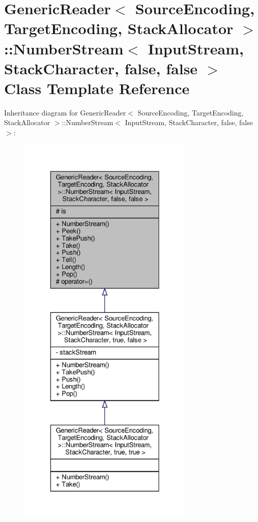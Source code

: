 \hypertarget{classGenericReader_1_1NumberStream_3_01InputStream_00_01StackCharacter_00_01false_00_01false_01_4}{}\section{Generic\+Reader$<$ Source\+Encoding, Target\+Encoding, Stack\+Allocator $>$\+:\+:Number\+Stream$<$ Input\+Stream, Stack\+Character, false, false $>$ Class Template Reference}
\label{classGenericReader_1_1NumberStream_3_01InputStream_00_01StackCharacter_00_01false_00_01false_01_4}


Inheritance diagram for Generic\+Reader$<$ Source\+Encoding, Target\+Encoding, Stack\+Allocator $>$\+:\+:Number\+Stream$<$ Input\+Stream, Stack\+Character, false, false $>$\+:
\nopagebreak
\begin{figure}[H]
\begin{center}
\leavevmode
\includegraphics[height=550pt]{classGenericReader_1_1NumberStream_3_01InputStream_00_01StackCharacter_00_01false_00_01false_01_4__inherit__graph}
\end{center}
\end{figure}


